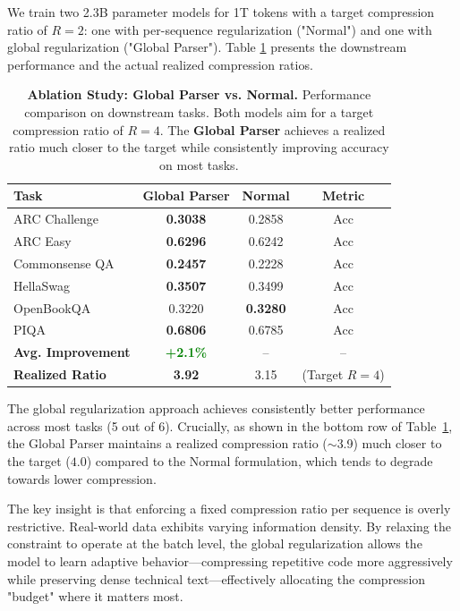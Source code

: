 We train two 2.3B parameter models for 1T tokens with a target compression ratio of $R=2$: one with per-sequence regularization ("Normal") and one with global regularization ("Global Parser"). Table \ref{tab:ablation} presents the downstream performance and the actual realized compression ratios.

\begin{table}[htbp]
\centering
\caption{\textbf{Ablation Study: Global Parser vs. Normal.} Performance comparison on downstream tasks. Both models aim for a target compression ratio of $R=4$. The \textbf{Global Parser} achieves a realized ratio much closer to the target while consistently improving accuracy on most tasks.}
\label{tab:ablation}
\renewcommand{\arraystretch}{1.15} %
\setlength{\tabcolsep}{10pt}       %

\begin{tabular}{lccc}
\toprule
\rowcolor{tabgray}
\textbf{Task} & \textbf{Global Parser} & \textbf{Normal} & \textbf{Metric} \\
\midrule
ARC Challenge   & \textbf{0.3038} & 0.2858 & Acc \\
ARC Easy        & \textbf{0.6296} & 0.6242 & Acc \\
Commonsense QA  & \textbf{0.2457} & 0.2228 & Acc \\
HellaSwag       & \textbf{0.3507} & 0.3499 & Acc \\
OpenBookQA      & 0.3220 & \textbf{0.3280} & Acc \\
PIQA            & \textbf{0.6806} & 0.6785 & Acc \\
\midrule
\rowcolor{tabgray}
\textbf{Avg. Improvement} & \textcolor{green}{\textbf{+2.1\%}} & -- & -- \\
\textbf{Realized Ratio}   & \textbf{3.92} & 3.15 & (Target $R{=}4$) \\
\bottomrule
\end{tabular}
\end{table}

The global regularization approach achieves consistently better performance across most tasks (5 out of 6). Crucially, as shown in the bottom row of Table~\ref{tab:ablation}, the Global Parser maintains a realized compression ratio ($\sim$3.9) much closer to the target ($4.0$) compared to the Normal formulation, which tends to degrade towards lower compression.

The key insight is that enforcing a fixed compression ratio per sequence is overly restrictive. Real-world data exhibits varying information density. By relaxing the constraint to operate at the batch level, the global regularization allows the model to learn adaptive behavior—compressing repetitive code more aggressively while preserving dense technical text—effectively allocating the compression "budget" where it matters most.

